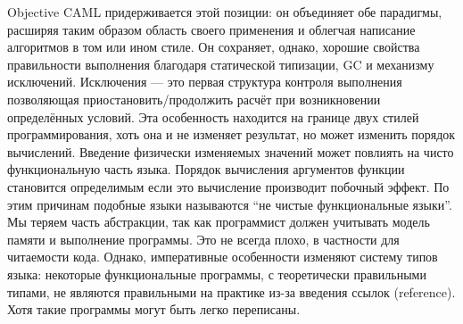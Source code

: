 Objective CAML придерживается этой позиции: он объединяет обе парадигмы,
расширяя таким образом область своего применения и облегчая написание алгоритмов
в том или ином стиле. Он сохраняет, однако, хорошие свойства правильности
выполнения благодаря статической типизации, GC и механизму исключений.
Исключения — это первая структура контроля выполнения позволяющая
приостановить/продолжить расчёт при возникновении определённых условий. Эта
особенность находится на границе двух стилей программирования, хоть она и не
изменяет результат, но может изменить порядок вычислений. Введение физически
изменяемых значений может повлиять на чисто функциональную часть языка. Порядок
вычисления аргументов функции становится определимым если это вычисление
производит побочный эффект. По этим причинам подобные языки называются “не
чистые функциональные языки”. Мы теряем часть абстракции, так как программист
должен учитывать модель памяти и выполнение программы. Это не всегда плохо, в
частности для читаемости кода. Однако, императивные особенности изменяют систему
типов языка: некоторые функциональные программы, с теоретически правильными
типами, не являются правильными на практике из-за введения ссылок (reference).
Хотя такие программы могут быть легко переписаны.